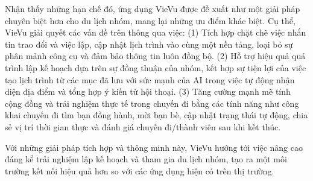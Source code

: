 Nhận thấy những hạn chế đó, ứng dụng VieVu được đề xuất như một giải pháp chuyên biệt hơn cho du lịch nhóm, mang lại những ưu điểm khác biệt. Cụ thể, VieVu giải quyết các vấn đề trên thông qua việc: (1) Tích hợp chặt chẽ việc nhắn tin trao đổi và việc lập, cập nhật lịch trình vào cùng một nền tảng, loại bỏ sự phân mảnh công cụ và đảm bảo thông tin luôn đồng bộ. (2) Hỗ trợ hiệu quả quá trình lập kế hoạch dựa trên sự đồng thuận của nhóm, kết hợp sự tiện lợi của việc tạo lịch trình từ các mục đã lưu với sức mạnh của AI trong việc tự động nhận diện địa điểm và tổng hợp ý kiến từ hội thoại. (3) Tăng cường mạnh mẽ tính cộng đồng và trải nghiệm thực tế trong chuyến đi bằng các tính năng như công khai chuyến đi tìm bạn đồng hành, mời bạn bè, cập nhật trạng thái tự động, chia sẻ vị trí thời gian thực và đánh giá chuyến đi/thành viên sau khi kết thúc.

Với những giải pháp tích hợp và thông minh này, VieVu hướng tới việc nâng cao đáng kể trải nghiệm lập kế hoạch và tham gia du lịch nhóm, tạo ra một môi trường kết nối hiệu quả hơn so với các ứng dụng hiện có trên thị trường.